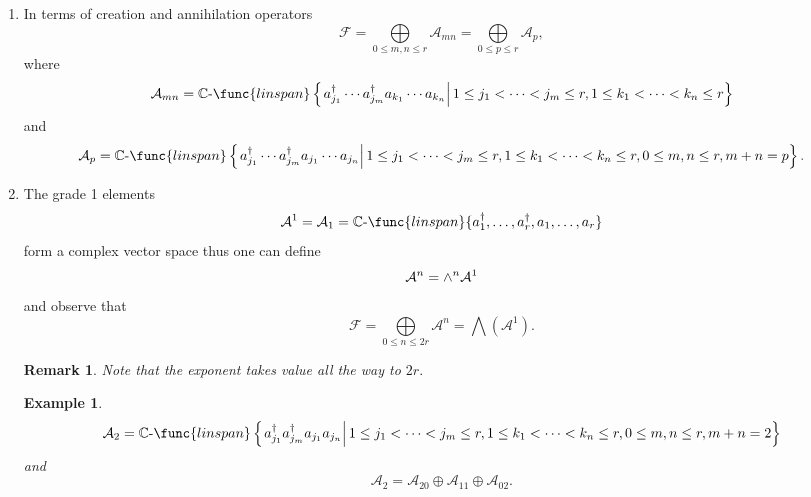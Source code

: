 \documentclass[aps,preprint]{revtex4}
\newtheorem{example}[theorem]{Example}
\newtheorem{remark}[theorem]{Remark}
\begin{document}
\begin{enumerate}
\begin{enumerate}
\begin{enumerate}
\item In terms of creation and annihilation operators 
\begin{equation}
\mathcal{F}=\bigoplus\limits_{0\leq m,n\leq r}\mathcal{A}_{mn}=\bigoplus%
\limits_{0\leq p\leq r}\mathcal{A}_{p},
\end{equation}%
where 
\begin{equation}
\mathcal{A}_{mn}=\mathbb{C}\text{-}\func{linspan}\left\{ \left.
a_{j_{1}}^{\dagger }\cdots a_{j_{m}}^{\dagger }a_{k_{1}}\cdots
a_{k_{n}}\right\vert 1\leq j_{1}<\cdots <j_{m}\leq r,1\leq k_{1}<\cdots
<k_{n}\leq r\right\}
\end{equation}%
and 
\begin{equation}
\mathcal{A}_{p}=\mathbb{C}\text{-}\func{linspan}\left\{ \left.
a_{j_{1}}^{\dagger }\cdots a_{j_{m}}^{\dagger }a_{j_{1}}\cdots
a_{j_{n}}\right\vert 1\leq j_{1}<\cdots <j_{m}\leq r,1\leq k_{1}<\cdots
<k_{n}\leq r,0\leq m,n\leq r,m+n=p\right\} .
\end{equation}

\item The grade 1 elements 
\begin{equation}
\mathcal{A}^{1}=\mathcal{A}_{1}=\mathbb{C}\text{-}\func{linspan}%
\{a_{1}^{\dagger },\ldots ,a_{r}^{\dagger },a_{1},\ldots ,a_{r}\}
\end{equation}%
form a complex vector space thus one can define 
\begin{equation}
\mathcal{A}^{n}={\Huge \wedge }^{n}\mathcal{A}^{1}
\end{equation}%
and observe that 
\begin{equation}
\mathcal{F}=\bigoplus\limits_{0\leq n\leq 2r}\mathcal{A}^{n}=\bigwedge
\left( \mathcal{A}^{1}\right) .
\end{equation}

\begin{remark}
Note that the exponent takes value all the way to $2r.$
\end{remark}

\begin{example}
\begin{equation}
\mathcal{A}_{2}=\mathbb{C}\text{-}\func{linspan}\left\{ \left.
a_{j_{1}}^{\dagger }a_{j_{m}}^{\dagger }a_{j_{1}}a_{j_{n}}\right\vert 1\leq
j_{1}<\cdots <j_{m}\leq r,1\leq k_{1}<\cdots <k_{n}\leq r,0\leq m,n\leq
r,m+n=2\right\}
\end{equation}%
and 
\begin{equation}
\mathcal{A}_{2}=\mathcal{A}_{20}\oplus \mathcal{A}_{11}\oplus \mathcal{A}%
_{02}.
\end{equation}
\end{example}


\end{enumerate}
\end{enumerate}
\end{enumerate}
\end{document}
